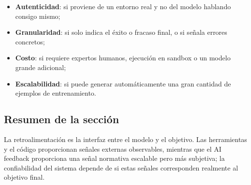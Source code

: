 \begin{itemize}
    \item \textbf{Autenticidad}: si proviene de un entorno real y no del modelo hablando consigo mismo;
    \item \textbf{Granularidad}: si solo indica el éxito o fracaso final, o si señala errores concretos;
    \item \textbf{Costo}: si requiere expertos humanos, ejecución en sandbox o un modelo grande adicional;
    \item \textbf{Escalabilidad}: si puede generar automáticamente una gran cantidad de ejemplos de entrenamiento.
\end{itemize}

\subsection{Resumen de la sección}

La retroalimentación es la interfaz entre el modelo y el objetivo. Las herramientas y el código proporcionan señales externas observables, mientras que el AI feedback proporciona una señal normativa escalable pero más subjetiva; la confiabilidad del sistema depende de si estas señales corresponden realmente al objetivo final.

